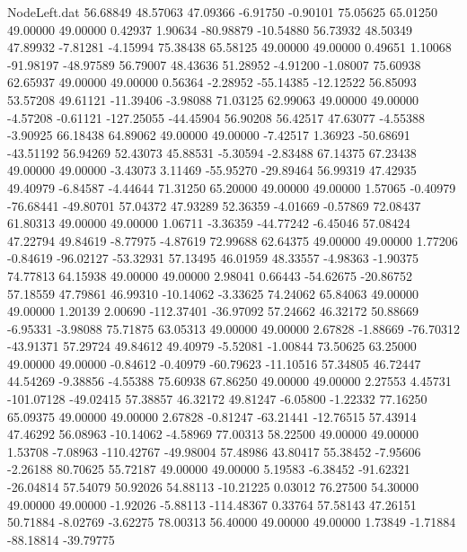 \begin{filecontents}{NodeLeft.dat}
  56.68849   48.57063   47.09366    -6.91750   -0.90101   75.05625   65.01250   49.00000   49.00000    0.42937    1.90634  -80.98879  -10.54880
  56.73932   48.50349   47.89932    -7.81281   -4.15994   75.38438   65.58125   49.00000   49.00000    0.49651    1.10068  -91.98197  -48.97589
  56.79007   48.43636   51.28952    -4.91200   -1.08007   75.60938   62.65937   49.00000   49.00000    0.56364   -2.28952  -55.14385  -12.12522
  56.85093   53.57208   49.61121   -11.39406   -3.98088   71.03125   62.99063   49.00000   49.00000   -4.57208   -0.61121 -127.25055  -44.45904
  56.90208   56.42517   47.63077    -4.55388   -3.90925   66.18438   64.89062   49.00000   49.00000   -7.42517    1.36923  -50.68691  -43.51192
  56.94269   52.43073   45.88531    -5.30594   -2.83488   67.14375   67.23438   49.00000   49.00000   -3.43073    3.11469  -55.95270  -29.89464
  56.99319   47.42935   49.40979    -6.84587   -4.44644   71.31250   65.20000   49.00000   49.00000    1.57065   -0.40979  -76.68441  -49.80701
  57.04372   47.93289   52.36359    -4.01669   -0.57869   72.08437   61.80313   49.00000   49.00000    1.06711   -3.36359  -44.77242   -6.45046
  57.08424   47.22794   49.84619    -8.77975   -4.87619   72.99688   62.64375   49.00000   49.00000    1.77206   -0.84619  -96.02127  -53.32931
  57.13495   46.01959   48.33557    -4.98363   -1.90375   74.77813   64.15938   49.00000   49.00000    2.98041    0.66443  -54.62675  -20.86752
  57.18559   47.79861   46.99310   -10.14062   -3.33625   74.24062   65.84063   49.00000   49.00000    1.20139    2.00690 -112.37401  -36.97092
  57.24662   46.32172   50.88669    -6.95331   -3.98088   75.71875   63.05313   49.00000   49.00000    2.67828   -1.88669  -76.70312  -43.91371
  57.29724   49.84612   49.40979    -5.52081   -1.00844   73.50625   63.25000   49.00000   49.00000   -0.84612   -0.40979  -60.79623  -11.10516
  57.34805   46.72447   44.54269    -9.38856   -4.55388   75.60938   67.86250   49.00000   49.00000    2.27553    4.45731 -101.07128  -49.02415
  57.38857   46.32172   49.81247    -6.05800   -1.22332   77.16250   65.09375   49.00000   49.00000    2.67828   -0.81247  -63.21441  -12.76515
  57.43914   47.46292   56.08963   -10.14062   -4.58969   77.00313   58.22500   49.00000   49.00000    1.53708   -7.08963 -110.42767  -49.98004
  57.48986   43.80417   55.38452    -7.95606   -2.26188   80.70625   55.72187   49.00000   49.00000    5.19583   -6.38452  -91.62321  -26.04814
  57.54079   50.92026   54.88113   -10.21225    0.03012   76.27500   54.30000   49.00000   49.00000   -1.92026   -5.88113 -114.48367    0.33764
  57.58143   47.26151   50.71884    -8.02769   -3.62275   78.00313   56.40000   49.00000   49.00000    1.73849   -1.71884  -88.18814  -39.79775

\end{filecontents}

